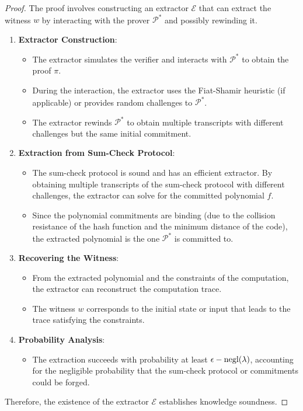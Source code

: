\documentclass{article}
\theoremstyle{plain}
\theoremstyle{definition}
\theoremstyle{remark}
\theoremstyle{problem}
\begin{document}
\begin{proof}
The proof involves constructing an extractor \(\mathcal{E}\) that can extract the witness \(w\) by interacting with the prover \(\mathcal{P}^*\) and possibly rewinding it.

\begin{enumerate}
    \item \textbf{Extractor Construction}:
    \begin{itemize}
        \item The extractor simulates the verifier and interacts with \(\mathcal{P}^*\) to obtain the proof \(\pi\).
        \item During the interaction, the extractor uses the Fiat-Shamir heuristic (if applicable) or provides random challenges to \(\mathcal{P}^*\).
        \item The extractor rewinds \(\mathcal{P}^*\) to obtain multiple transcripts with different challenges but the same initial commitment.
    \end{itemize}

    \item \textbf{Extraction from Sum-Check Protocol}:
    \begin{itemize}
        \item The sum-check protocol is sound and has an efficient extractor. By obtaining multiple transcripts of the sum-check protocol with different challenges, the extractor can solve for the committed polynomial \(f\).
        \item Since the polynomial commitments are binding (due to the collision resistance of the hash function and the minimum distance of the code), the extracted polynomial is the one \(\mathcal{P}^*\) is committed to.
    \end{itemize}

    \item \textbf{Recovering the Witness}:
    \begin{itemize}
        \item From the extracted polynomial and the constraints of the computation, the extractor can reconstruct the computation trace.
        \item The witness \(w\) corresponds to the initial state or input that leads to the trace satisfying the constraints.
    \end{itemize}

    \item \textbf{Probability Analysis}:
    \begin{itemize}
        \item The extraction succeeds with probability at least \(\epsilon - \textnormal{negl}(\lambda)\), accounting for the negligible probability that the sum-check protocol or commitments could be forged.
    \end{itemize}
\end{enumerate}

Therefore, the existence of the extractor \(\mathcal{E}\) establishes knowledge soundness.
\end{proof}
\end{document}

